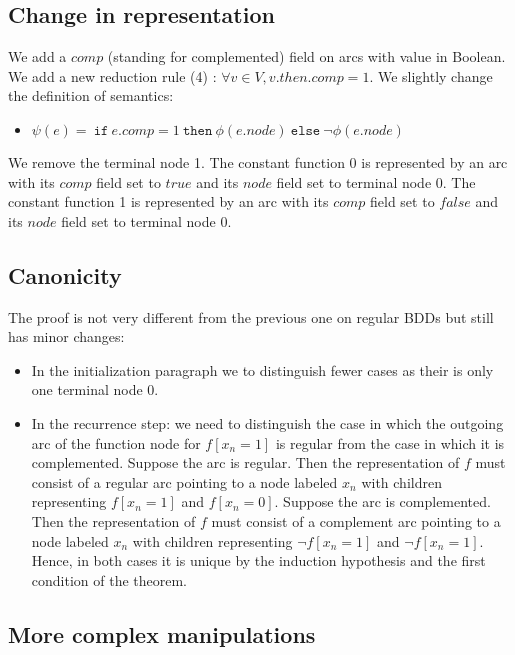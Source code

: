 \documentclass[a4paper,10pt]{article}
\begin{document}
\subsection{Change in representation}
We add a $comp$ (standing for complemented) field on arcs with value in Boolean.
We add a new reduction rule (4) : $\forall v\in V, v.then.comp = 1$.
We slightly change the definition of semantics:\begin{itemize}
  \item $\psi(e) =\mathtt{~if~}e.comp = 1\mathtt{~then~}\phi(e.node)\mathtt{~else~}\lnot \phi(e.node)$
\end{itemize}
We remove the terminal node 1.
The constant function 0 is represented by an arc with its $comp$ field set to $true$ and its $node$ field set to terminal node $0$.
The constant function 1 is represented by an arc with its $comp$ field set to $false$ and its $node$ field set to terminal node $0$.


\subsection{Canonicity}

The proof is not very different from the previous one on regular BDDs but still has minor changes:\begin{itemize}
\item In the initialization paragraph we to distinguish fewer cases as their is only one terminal node 0.
\item In the recurrence step: we need to distinguish the case in which the outgoing arc of the function node for $f[x_n=1]$ is regular from the case in which it is complemented.
Suppose the arc is regular.
Then the representation of $f$ must consist of a regular arc pointing to a node labeled $x_n$ with children representing $f[x_n=1]$ and $f[x_n=0]$.
Suppose the arc is complemented.
Then the representation of $f$ must consist of a complement arc pointing to a node labeled $x_n$ with children representing $\lnot f[x_n=1]$ and $\lnot f[x_n=1]$.
Hence, in both cases it is unique by the induction hypothesis and the first condition of the theorem.
\end{itemize}




\subsection{More complex manipulations}
\end{document}
